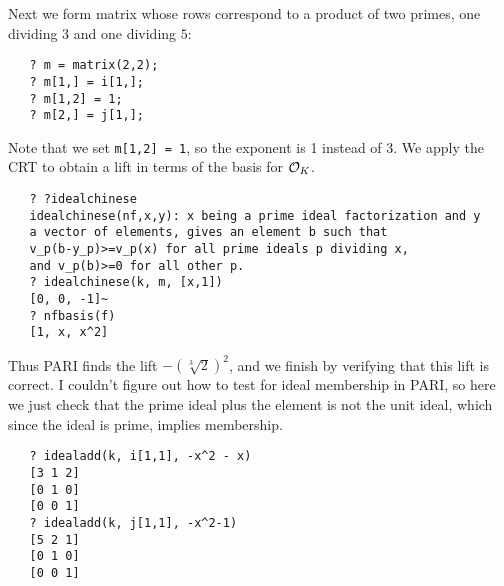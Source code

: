 Next we form matrix whose rows correspond to a product of two primes,
one dividing $3$ and one dividing $5$:
\begin{verbatim}
   ? m = matrix(2,2);       
   ? m[1,] = i[1,];  
   ? m[1,2] = 1;
   ? m[2,] = j[1,];
\end{verbatim}
Note that we set {\tt m[1,2] = 1}, so the exponent is 1
instead of $3$.
We apply the CRT to obtain a lift in terms
of the basis for $\mathcal{O}_K$. 
\begin{verbatim}
   ? ?idealchinese
   idealchinese(nf,x,y): x being a prime ideal factorization and y 
   a vector of elements, gives an element b such that 
   v_p(b-y_p)>=v_p(x) for all prime ideals p dividing x, 
   and v_p(b)>=0 for all other p.
   ? idealchinese(k, m, [x,1])
   [0, 0, -1]~
   ? nfbasis(f)
   [1, x, x^2]
\end{verbatim}
Thus PARI finds the lift $-(\sqrt[3]{2})^2$, and we finish by
verifying that this lift is correct.  I couldn't figure out how to
test for ideal membership in PARI, so here we just check that the
prime ideal plus the element is not the unit ideal, which since the
ideal is prime, implies membership.
\begin{verbatim}
   ? idealadd(k, i[1,1], -x^2 - x)
   [3 1 2]
   [0 1 0]
   [0 0 1]
   ? idealadd(k, j[1,1], -x^2-1)
   [5 2 1]
   [0 1 0]
   [0 0 1]
\end{verbatim}



